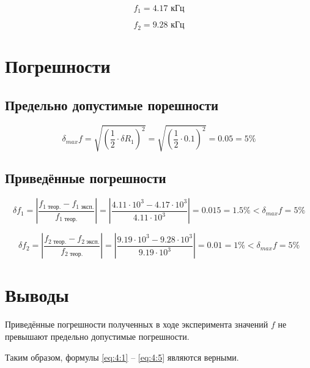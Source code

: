 \begin{displaymath}
	f_1 = 4.17 \text{ кГц}
\end{displaymath}

\begin{displaymath}
	f_2 = 9.28 \text{ кГц}
\end{displaymath}

\section{Погрешности}

\subsection{Предельно допустимые порешности}

\begin{displaymath}
\delta_{max} f = \sqrt{\left(\frac{1}{2} \cdot \delta R_1 \right)^2} = \sqrt{\left(\frac{1}{2} \cdot 0.1 \right)^2} = 0.05 = 5 \%
\end{displaymath}

\subsection{Приведённые погрешности}

\begin{displaymath}
	\delta f_1 = \left|\frac{f_\text{1 теор.} - f_\text{1 эксп.}}{f_\text{1 теор.}} \right| = \left|\frac{4.11 \cdot 10^3 - 4.17 \cdot 10^3}{4.11 \cdot 10^3}\right| = 0.015 = 1.5\% < \delta_{max} f = 5\%
\end{displaymath}

\begin{displaymath}
	\delta f_2 = \left|\frac{f_\text{2 теор.} - f_\text{2 эксп.}}{f_\text{2 теор.}} \right| = \left|\frac{9.19 \cdot 10^3 - 9.28 \cdot 10^3}{9.19 \cdot 10^3}\right| = 0.01 = 1\% < \delta_{max} f = 5\%
\end{displaymath}

\section{Выводы}

Приведённые погрешности полученных в ходе эксперимента значений $f$ не превышают предельно допустимые погрешности.

Таким образом, формулы \ref{eq:4:1} -- \ref{eq:4:5} являются верными.

